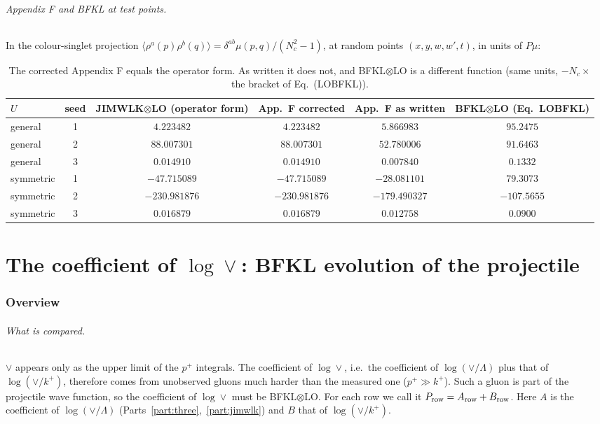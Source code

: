 \documentclass[10pt]{article}
\numberwithin{equation}{section}
\begin{document}
\paragraph{Appendix F and BFKL at test points.} In the colour-singlet projection $\langle\rho^a(p)\rho^b(q)\rangle=\delta^{ab}\mu(p,q)/(N_c^2-1)$, at random points $(x,y,w,w',t)$, in units of $P\mu$:
\begin{table}[h]
\centering\small
\begin{tabular}{@{}l c c c c c@{}}
$U$ & seed & JIMWLK$\otimes$LO (operator form) & App.\ F corrected & App.\ F as written & BFKL$\otimes$LO (Eq.~LOBFKL)\\ \hline
general & 1 & $4.223482$ & $4.223482$ & $5.866983$ & $95.2475$\\
general & 2 & $88.007301$ & $88.007301$ & $52.780006$ & $91.6463$\\
general & 3 & $0.014910$ & $0.014910$ & $0.007840$ & $0.1332$\\
symmetric & 1 & $-47.715089$ & $-47.715089$ & $-28.081101$ & $79.3073$\\
symmetric & 2 & $-230.981876$ & $-230.981876$ & $-179.490327$ & $-107.5655$\\
symmetric & 3 & $0.016879$ & $0.016879$ & $0.012758$ & $0.0900$\\
\end{tabular}
\caption{The corrected Appendix F equals the operator form. As written it does not, and BFKL$\otimes$LO is a different function (same units, $-N_c\times$ the bracket of Eq.~(LOBFKL)).}
\label{T:tab:appF}
\end{table}




\part{The coefficient of \texorpdfstring{$\log\vee$}{log vee}: BFKL evolution of the projectile}\label{part:bfkl}
\section{Overview}\label{sec:bfkl-overview}
\paragraph{What is compared.} $\vee$ appears only as the upper limit of the $p^+$ integrals. The coefficient of $\log\vee$, i.e.\ the coefficient of $\log(\vee/\Lambda)$ plus that of $\log(\vee/k^+)$, therefore comes from unobserved gluons much harder than the measured one ($p^+\gg k^+$). Such a gluon is part of the projectile wave function, so the coefficient of $\log\vee$ must be BFKL$\otimes$LO. For each row we call it $P_{\rm row}=A_{\rm row}+B_{\rm row}$. Here $A$ is the coefficient of $\log(\vee/\Lambda)$ (Parts~\ref{part:three},~\ref{part:jimwlk}) and $B$ that of $\log(\vee/k^+)$.
\end{document}
